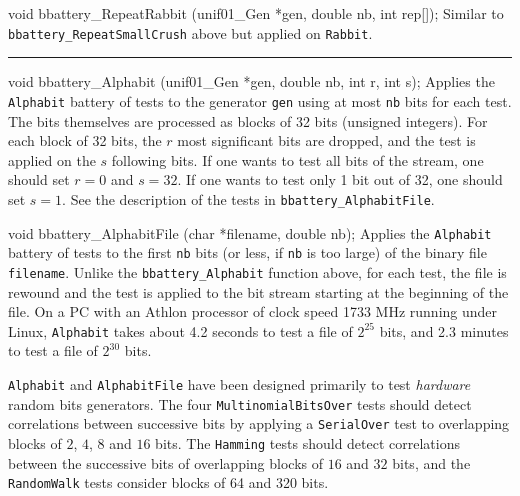void bbattery_RepeatRabbit (unif01_Gen *gen, double nb, int rep[]);
\endcode
  \tab Similar to {\tt bbattery\_RepeatSmallCrush} above but applied on
 {\tt Rabbit}.
  \endtab

\bigskip
\hrule
\code


void bbattery_Alphabit (unif01_Gen *gen, double nb, int r, int s);
\endcode
  \tab Applies the {\tt Alphabit} battery of tests to the generator {\tt gen}
   using at most {\tt nb} bits for each test. The bits themselves are
  processed as blocks of 32 bits (unsigned integers). For each block of
  32 bits, the $r$ most significant bits are dropped, and the test is
  applied on the $s$ following bits. If one wants to test all bits of
  the stream, one should set $r=0$ and $s=32$. If one wants to test only
  1 bit out of 32, one should set $s=1$.
   See the description of the tests in {\tt bbattery\_AlphabitFile}.
  \endtab
\code


void bbattery_AlphabitFile (char *filename, double nb);
\endcode
  \tab Applies the {\tt Alphabit} battery of tests to the first {\tt nb}
   bits (or less, if {\tt nb} is too large) of the binary file
   {\tt filename}. Unlike the {\tt bbattery\_Alphabit} function above,
  for each test, the file is rewound and the test is applied to the bit
  stream starting at the beginning of the file.
  On a PC with an Athlon processor of clock speed 1733 MHz running under
  Linux,  {\tt Alphabit} takes about 4.2 seconds to test a file of
  $2^{25}$ bits, and 2.3 minutes to test a file of $2^{30}$ bits.

  {\tt Alphabit} and {\tt AlphabitFile} have been designed primarily to test
   {\it hardware} random bits generators. The four {\tt MultinomialBitsOver}
  tests should detect correlations between successive bits by
   applying a {\tt SerialOver} test to overlapping blocks of $2$, $4$,
   $8$ and $16$ bits. The {\tt Hamming} tests should detect correlations
  between the successive bits of overlapping blocks of $16$ and $32$ bits,
  and the {\tt RandomWalk} tests consider blocks of 64 and 320 bits.

  \endtab

